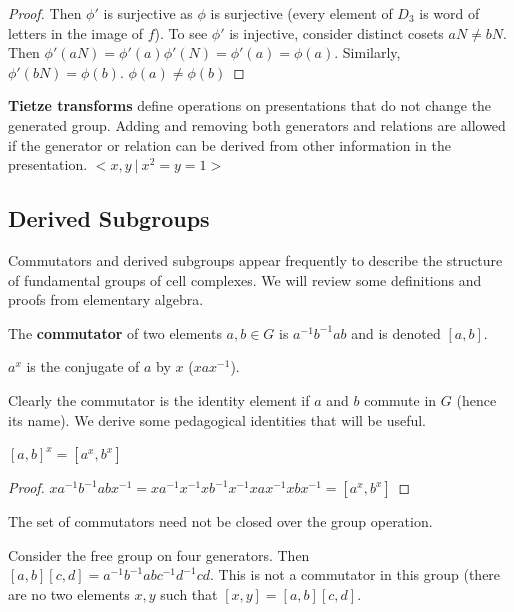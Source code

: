 \documentclass[10pt]{article}
\begin{document}
\begin{definition}
\begin{definition}
\begin{proof}
	Then $\phi'$ is surjective as $\phi$ is surjective (every element of $D_3$ is
	word of letters in the image of $f$). To see $\phi'$ is injective, consider
	distinct cosets $aN \neq bN$. Then $\phi'(aN) = \phi'(a)\phi'(N) = \phi'(a) =
	\phi(a)$. Similarly, $\phi'(bN) = \phi(b)$. $\phi(a) \neq \phi(b)$

\end{proof}


\begin{note}
	\textbf{Tietze transforms} define operations on presentations that do not
	change the generated group. Adding and removing both generators and relations
	are allowed if the generator or relation can be derived from other
	information in the presentation.
	$< x, y ~|~ x^2 = y = 1>$
\end{note}

\subsection{Derived Subgroups}

Commutators and derived subgroups appear frequently to describe the structure
of fundamental groups of cell complexes. We will review some definitions and
proofs from elementary algebra.

\begin{definition}
	The \textbf{commutator} of two elements $a, b \in G$ is $a^{-1}b^{-1}ab$ and
	is denoted $[a, b]$.
\end{definition}

\begin{definition}
	$a^x$ is the conjugate of $a$ by $x$ ($xax^{-1}$).
\end{definition}

Clearly the commutator is the identity element if $a$ and $b$ commute in $G$
(hence its name). We derive some pedagogical identities that will be useful.

\begin{definition}
	$[a, b]^x = [a^x,b^x]$
\end{definition}
\begin{proof}
	$xa^{-1}b^{-1}abx^{-1} = xa^{-1}x^{-1}xb^{-1}x^{-1}xax^{-1}xbx^{-1} = [a^x,b^x]$
\end{proof}

\begin{note}
	The set of commutators need not be closed over the group operation.

	Consider the free group on four generators. Then $[a, b][c, d] =
	a^{-1}b^{-1}abc^{-1}d^{-1}cd$. This is not a commutator in this group (there
	are no two elements $x, y$ such that $[x, y] = [a, b][c, d]$.
\end{note}


\end{definition}
\end{definition}
\end{document}
